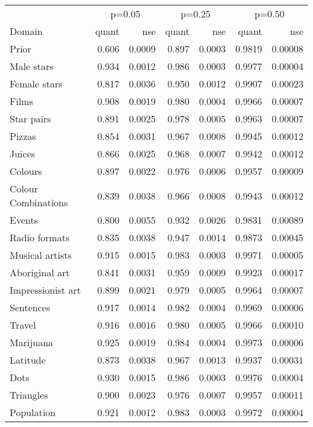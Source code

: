 
\begin{tabular}[t]{lrrrrrr}
\toprule
\multicolumn{1}{c}{ } & \multicolumn{2}{c}{p=0.05} & \multicolumn{2}{c}{p=0.25} & \multicolumn{2}{c}{p=0.50} \\
\cmidrule(l{3pt}r{3pt}){2-3} \cmidrule(l{3pt}r{3pt}){4-5} \cmidrule(l{3pt}r{3pt}){6-7}
Domain & quant & nse & quant & nse & quant & nse\\
\midrule
Prior & 0.606 & 0.0009 & 0.897 & 0.0003 & 0.9819 & 0.00008\\
Male stars & 0.934 & 0.0012 & 0.986 & 0.0003 & 0.9977 & 0.00004\\
Female stars & 0.817 & 0.0036 & 0.950 & 0.0012 & 0.9907 & 0.00023\\
Films & 0.908 & 0.0019 & 0.980 & 0.0004 & 0.9966 & 0.00007\\
Star pairs & 0.891 & 0.0025 & 0.978 & 0.0005 & 0.9963 & 0.00007\\
\addlinespace
Pizzas & 0.854 & 0.0031 & 0.967 & 0.0008 & 0.9945 & 0.00012\\
Juices & 0.866 & 0.0025 & 0.968 & 0.0007 & 0.9942 & 0.00012\\
Colours & 0.897 & 0.0022 & 0.976 & 0.0006 & 0.9957 & 0.00009\\
Colour Combinations & 0.839 & 0.0038 & 0.966 & 0.0008 & 0.9943 & 0.00012\\
Events & 0.800 & 0.0055 & 0.932 & 0.0026 & 0.9831 & 0.00089\\
\addlinespace
Radio formats & 0.835 & 0.0038 & 0.947 & 0.0014 & 0.9873 & 0.00045\\
Musical artists & 0.915 & 0.0015 & 0.983 & 0.0003 & 0.9971 & 0.00005\\
Aboriginal art & 0.841 & 0.0031 & 0.959 & 0.0009 & 0.9923 & 0.00017\\
Impressionist art & 0.899 & 0.0021 & 0.979 & 0.0005 & 0.9964 & 0.00007\\
Sentences & 0.917 & 0.0014 & 0.982 & 0.0004 & 0.9969 & 0.00006\\
\addlinespace
Travel & 0.916 & 0.0016 & 0.980 & 0.0005 & 0.9966 & 0.00010\\
Marijuana & 0.925 & 0.0019 & 0.984 & 0.0004 & 0.9973 & 0.00006\\
Latitude & 0.873 & 0.0038 & 0.967 & 0.0013 & 0.9937 & 0.00031\\
Dots & 0.930 & 0.0015 & 0.986 & 0.0003 & 0.9976 & 0.00004\\
Triangles & 0.900 & 0.0023 & 0.976 & 0.0007 & 0.9957 & 0.00011\\
\addlinespace
Population & 0.921 & 0.0012 & 0.983 & 0.0003 & 0.9972 & 0.00004\\

\end{tabular}
